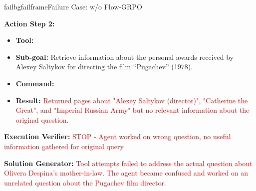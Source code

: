\begin{small}
\begin{center}
\begin{casebox}{failbg}{failframe}{Failure Case: \model w/o Flow-GRPO}
    \vspace{1em}

    \textbf{Action Step 2:}
    \begin{itemize}[nosep, leftmargin=*]
        \item \textbf{Tool:} 
        \item \textbf{Sub-goal:} Retrieve information about the personal awards received by Alexey Saltykov for directing the film ``Pugachev'' (1978).
        \item \textbf{Command:}

        \item \textbf{Result:} \textcolor{red}{Returned pages about "Alexey Saltykov (director)", "Catherine the Great", and "Imperial Russian Army" but no relevant information about the original question.}
    \end{itemize}

    \vspace{1em}

    \textbf{Execution Verifier:} \textcolor{red}{STOP - Agent worked on wrong question, no useful information gathered for original query}

    \vspace{1em}

    \textbf{Solution Generator:} \textcolor{red}{Tool attempts failed to address the actual question about Olivera Despina's mother-in-law. The agent became confused and worked on an unrelated question about the Pugachev film director.}

\end{casebox}

\end{center}
\end{small}
